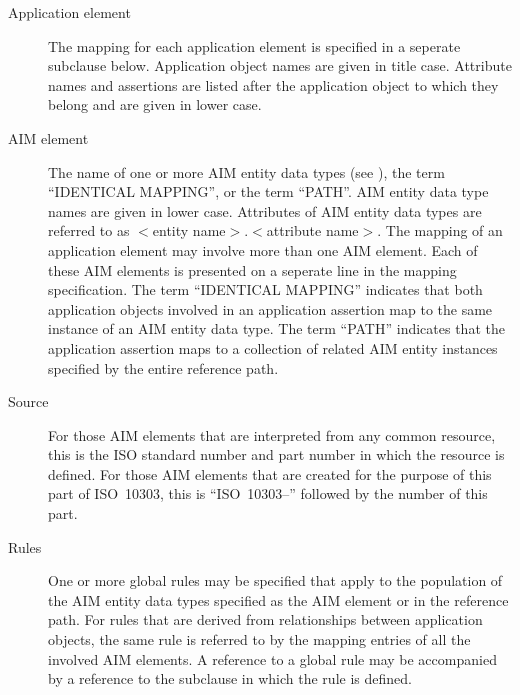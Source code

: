 \begin{description}
\item[Application element] The mapping for each application element
    is specified in a seperate subclause below.
    Application object names are given in title case.
    Attribute names and assertions are listed after the application
    object to which they belong and are given in lower case.

\item[AIM element] The name of one or more AIM entity data types
    (see ), the term ``IDENTICAL MAPPING'',
    or the term ``PATH''.
    AIM entity data type names are given in lower case.
    Attributes of AIM entity data types are referred to as
    $<$entity name$>$.$<$attribute name$>$.
    The mapping of an application element may involve more than
    one AIM element.
    Each of these AIM elements is presented on a seperate line
    in the mapping specification.
    The term ``IDENTICAL MAPPING'' indicates that both application
    objects involved in an application assertion map to the same
    instance of an AIM entity data type.
    The term ``PATH'' indicates that the application assertion maps
    to a collection of related AIM entity instances specified
    by the entire reference path.

\item[Source] For those AIM elements that are
    interpreted from any common resource, this is the ISO standard
    number and part number in which the resource is defined.
    For those AIM elements that are created for the purpose of this part
    of ISO~10303, this is ``ISO~10303--'' followed by the number of
    this part.

\item[Rules] One or more global rules may be specified that
    apply to the population of the AIM entity data types specified
    as the AIM element or in the reference path.
    For rules that are derived from
    relationships between application objects, the same rule
    is referred to by the mapping entries of all the involved AIM
    elements.
    A reference to a global rule may be accompanied by a reference to
    the subclause in which the rule is defined.


\end{description}
